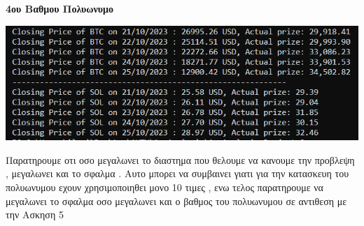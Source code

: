\documentclass[a4paper,11pt]{article}
\begin{document}
	\begin{center}
		\textbf{	4ου Βαθμου Πολυωνυμο }
	\end{center}
	\begin{center}
		\emph{\includegraphics[scale=0.75]{ex7_4.png}}
	\end{center}
	\begin{center}
		Παρατηρουμε οτι οσο μεγαλωνει το διαστημα που θελουμε να κανουμε την προβλεψη , μεγαλωνει και το σφαλμα . Αυτο μπορει να συμβαινει γιατι για την κατασκευη του πολυωνυμου εχουν χρησιμοποιηθει μονο 10 τιμες , ενω τελος παρατηρουμε να μεγαλωνει το σφαλμα οσο μεγαλωνει και ο βαθμος του πολυωνυμου σε αντιθεση με την Ασκηση 5
	\end{center}
\end{document}
